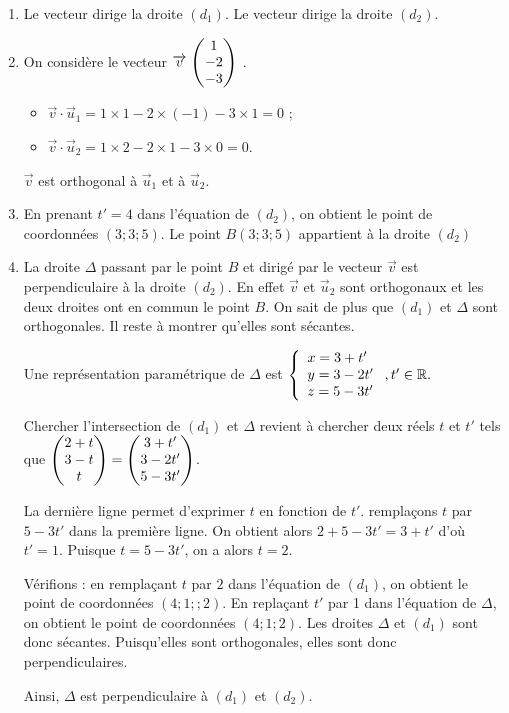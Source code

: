\documentclass[11pt,fleqn, openany]{book} %
\begin{document}
\begin{solution}\hspace{0pt}
\begin{enumerate}
\item Le vecteur  dirige la droite $(d_1)$. Le vecteur  dirige la droite $(d_2)$.
\item On considère le vecteur $\coorde{v}{1}{-2}{-3}$ .

\begin{itemize}
\item $\vec v \cdot \vec u_1 = 1 \times 1 - 2 \times (-1) -3 \times 1 =0$ ;
\item $\vec v \cdot \vec u_2 = 1 \times 2 -2 \times 1 -3 \times 0 =0$.
\end{itemize}

$\vec v$ est orthogonal à $\vec u_1$ et à $\vec u_2$.
\item En prenant $t'=4$ dans l'équation de $(d_2)$, on obtient le point de coordonnées $(3;3;5)$. Le point $B(3;3;5)$ appartient à la droite $(d_2)$
\item La droite $\Delta$ passant par le point $B$ et dirigé par le vecteur $\vec v$ est perpendiculaire à la droite $(d_2)$. En effet $\vec v$ et $\vec u_2$ sont orthogonaux et les deux droites ont en commun le point $B$.
On sait de plus que $(d_1)$ et $\Delta$ sont orthogonales. Il reste à montrer qu'elles sont sécantes. 

Une représentation paramétrique de $\Delta$ est $\left\{ \renewcommand{\arraystretch}{1}\renewcommand{\arraystretch}{1}\begin{array}{l}x=3+t' \\ y=3-2t' \\ z=5-3t' \end{array}\right.,t' \in \mathbb{R}.$

Chercher l'intersection de $(d_1)$ et $\Delta$ revient à chercher deux réels $t$ et $t'$ tels que $\coordbe{2+t}{3-t}{t}=\coordbe{3+t'}{3-2t'}{5-3t'}$.

La dernière ligne permet d'exprimer $t$ en fonction de $t'$. remplaçons $t$ par $5-3t'$ dans la première ligne. On obtient alors $2+5-3t'=3+t'$ d'où $t'=1$. Puisque $t=5-3t'$, on a alors $t=2$.

Vérifions : en remplaçant $t$ par $2$ dans l'équation de $(d_1)$, on obtient le point de coordonnées $(4;1;;2)$. En replaçant $t'$ par 1 dans l'équation de $\Delta$, on obtient le point de coordonnées $(4;1;2)$. Les droites $\Delta$ et $(d_1)$ sont donc sécantes. Puisqu'elles sont orthogonales, elles sont donc perpendiculaires.

Ainsi, $\Delta$ est perpendiculaire à $(d_1)$ et $(d_2)$.
\end{enumerate}\end{solution}
\end{document}
